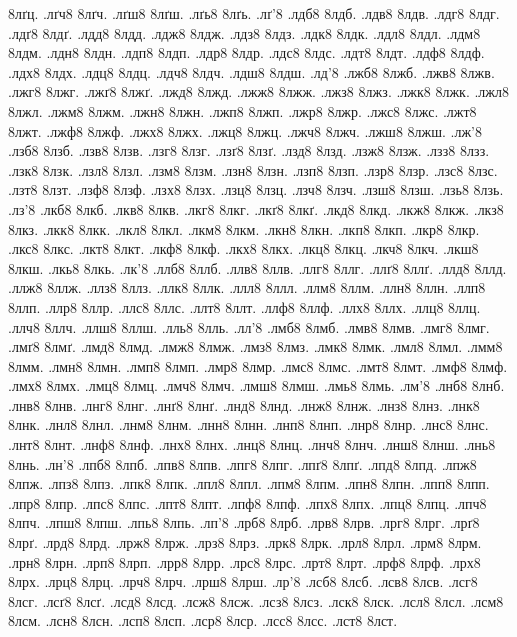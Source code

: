 {8лґц.
.лґч8
8лґч.
.лґш8
8лґш.
.лґь8
8лґь.
.лґ'8
.лдб8
8лдб.
.лдв8
8лдв.
.лдг8
8лдг.
.лдґ8
8лдґ.
.лдд8
8лдд.
.лдж8
8лдж.
.лдз8
8лдз.
.лдк8
8лдк.
.лдл8
8лдл.
.лдм8
8лдм.
.лдн8
8лдн.
.лдп8
8лдп.
.лдр8
8лдр.
.лдс8
8лдс.
.лдт8
8лдт.
.лдф8
8лдф.
.лдх8
8лдх.
.лдц8
8лдц.
.лдч8
8лдч.
.лдш8
8лдш.
.лд'8
.лжб8
8лжб.
.лжв8
8лжв.
.лжг8
8лжг.
.лжґ8
8лжґ.
.лжд8
8лжд.
.лжж8
8лжж.
.лжз8
8лжз.
.лжк8
8лжк.
.лжл8
8лжл.
.лжм8
8лжм.
.лжн8
8лжн.
.лжп8
8лжп.
.лжр8
8лжр.
.лжс8
8лжс.
.лжт8
8лжт.
.лжф8
8лжф.
.лжх8
8лжх.
.лжц8
8лжц.
.лжч8
8лжч.
.лжш8
8лжш.
.лж'8
.лзб8
8лзб.
.лзв8
8лзв.
.лзг8
8лзг.
.лзґ8
8лзґ.
.лзд8
8лзд.
.лзж8
8лзж.
.лзз8
8лзз.
.лзк8
8лзк.
.лзл8
8лзл.
.лзм8
8лзм.
.лзн8
8лзн.
.лзп8
8лзп.
.лзр8
8лзр.
.лзс8
8лзс.
.лзт8
8лзт.
.лзф8
8лзф.
.лзх8
8лзх.
.лзц8
8лзц.
.лзч8
8лзч.
.лзш8
8лзш.
.лзь8
8лзь.
.лз'8
.лкб8
8лкб.
.лкв8
8лкв.
.лкг8
8лкг.
.лкґ8
8лкґ.
.лкд8
8лкд.
.лкж8
8лкж.
.лкз8
8лкз.
.лкк8
8лкк.
.лкл8
8лкл.
.лкм8
8лкм.
.лкн8
8лкн.
.лкп8
8лкп.
.лкр8
8лкр.
.лкс8
8лкс.
.лкт8
8лкт.
.лкф8
8лкф.
.лкх8
8лкх.
.лкц8
8лкц.
.лкч8
8лкч.
.лкш8
8лкш.
.лкь8
8лкь.
.лк'8
.ллб8
8ллб.
.ллв8
8ллв.
.ллг8
8ллг.
.ллґ8
8ллґ.
.ллд8
8ллд.
.ллж8
8ллж.
.ллз8
8ллз.
.ллк8
8ллк.
.ллл8
8ллл.
.ллм8
8ллм.
.ллн8
8ллн.
.ллп8
8ллп.
.ллр8
8ллр.
.ллс8
8ллс.
.ллт8
8ллт.
.ллф8
8ллф.
.ллх8
8ллх.
.ллц8
8ллц.
.ллч8
8ллч.
.ллш8
8ллш.
.лль8
8лль.
.лл'8
.лмб8
8лмб.
.лмв8
8лмв.
.лмг8
8лмг.
.лмґ8
8лмґ.
.лмд8
8лмд.
.лмж8
8лмж.
.лмз8
8лмз.
.лмк8
8лмк.
.лмл8
8лмл.
.лмм8
8лмм.
.лмн8
8лмн.
.лмп8
8лмп.
.лмр8
8лмр.
.лмс8
8лмс.
.лмт8
8лмт.
.лмф8
8лмф.
.лмх8
8лмх.
.лмц8
8лмц.
.лмч8
8лмч.
.лмш8
8лмш.
.лмь8
8лмь.
.лм'8
.лнб8
8лнб.
.лнв8
8лнв.
.лнг8
8лнг.
.лнґ8
8лнґ.
.лнд8
8лнд.
.лнж8
8лнж.
.лнз8
8лнз.
.лнк8
8лнк.
.лнл8
8лнл.
.лнм8
8лнм.
.лнн8
8лнн.
.лнп8
8лнп.
.лнр8
8лнр.
.лнс8
8лнс.
.лнт8
8лнт.
.лнф8
8лнф.
.лнх8
8лнх.
.лнц8
8лнц.
.лнч8
8лнч.
.лнш8
8лнш.
.лнь8
8лнь.
.лн'8
.лпб8
8лпб.
.лпв8
8лпв.
.лпг8
8лпг.
.лпґ8
8лпґ.
.лпд8
8лпд.
.лпж8
8лпж.
.лпз8
8лпз.
.лпк8
8лпк.
.лпл8
8лпл.
.лпм8
8лпм.
.лпн8
8лпн.
.лпп8
8лпп.
.лпр8
8лпр.
.лпс8
8лпс.
.лпт8
8лпт.
.лпф8
8лпф.
.лпх8
8лпх.
.лпц8
8лпц.
.лпч8
8лпч.
.лпш8
8лпш.
.лпь8
8лпь.
.лп'8
.лрб8
8лрб.
.лрв8
8лрв.
.лрг8
8лрг.
.лрґ8
8лрґ.
.лрд8
8лрд.
.лрж8
8лрж.
.лрз8
8лрз.
.лрк8
8лрк.
.лрл8
8лрл.
.лрм8
8лрм.
.лрн8
8лрн.
.лрп8
8лрп.
.лрр8
8лрр.
.лрс8
8лрс.
.лрт8
8лрт.
.лрф8
8лрф.
.лрх8
8лрх.
.лрц8
8лрц.
.лрч8
8лрч.
.лрш8
8лрш.
.лр'8
.лсб8
8лсб.
.лсв8
8лсв.
.лсг8
8лсг.
.лсґ8
8лсґ.
.лсд8
8лсд.
.лсж8
8лсж.
.лсз8
8лсз.
.лск8
8лск.
.лсл8
8лсл.
.лсм8
8лсм.
.лсн8
8лсн.
.лсп8
8лсп.
.лср8
8лср.
.лсс8
8лсс.
.лст8
8лст.
}
